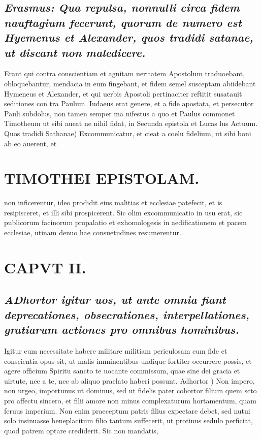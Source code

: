 \documentclass{article}
\begin{document}
\begin{pages}
\subsection*{\textit{Erasmus: Qua repulsa, nonnulli circa fidem nauftagium fecerunt, quorum de numero est Hyemenus et Alexander, quos tradidi satanae, ut discant non maledicere. }}\pstart Erant qui contra conscientiam et agnitam ueritatem Apostolum traduoebant, obloquebantur, mendacia in eum fingebant, et fidem semel susceptam abiidebant Hymeneus et Alexander, et qui uerbis Apostoli pertinaciter reftitit susatauit seditiones con tra Paulum. Iudaeus erat genere, et a fide apostata, et persecutor Pauli subdolus, non tamen semper ma nifestus a quo et Paulus commonet Timotheum ut sibi aueat ne nihil fidat, in Secunda epistola et Lucas lus Actuum.  \pend\pstart Quos tradidi Sathanae) Excommunicatur, et cieat a coelu fidelium, ut sibi boni ab eo auerent, et  \pend
\section*{TIMOTHEI EPISTOLAM. }
\marginpar{[ p.41 ]}\pstart non inficerentur, ideo prodidit eius malitias et ecclesiae patefecit, et is resipisceret, et illi sibi prospicerent. Sic olim excommunicatio in usu erat, sic publicorum facinorum propalatio et exhomologesis in aedificationem et pacem ecclesiae, utinam denuo hae consuetudines resumerentur.  \pend
\endnumbering\beginnumbering\section{CAPVT II.}
{}
\subsection*{\textit{\huge\textbf{A}\normalsize Dhortor igitur uos, ut ante omnia fiant deprecationes, obsecrationes, interpellationes, gratiarum actiones pro omnibus hominibus. }}\pstart Igitur cum necessitate habere militare militiam periculosam cum fide et conscientia opus sit, ut malis imminentibus undique fortiter occurrere possis, et agere officium Spiritu sancto te uocante commissum, quae sine dei gracia et uirtute, nec a te, nec ab aliquo praelato haberi possunt.  \pend\pstart Adhortor ) Non impero, non urgeo, importunus ut dominus, sed ut fidelis pater cohortor filium quem scto pro affectu sincero, et filii amore non minus complexaturum hortamentum, quam feruus imperium. Non enim praeceptum patris filius expectare debet, sed nutui solo insinuasse beneplacitum filio tantum suffecerit, ut protinus sedulo perficiat, quod patrem optare crediderit. Sic non mandatis,  \pend

\end{pages}
\end{document}

